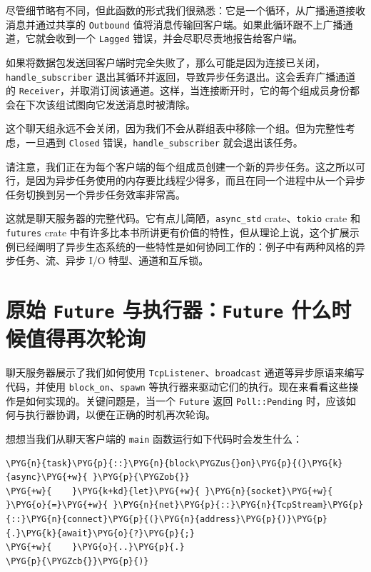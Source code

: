 尽管细节略有不同，但此函数的形式我们很熟悉：它是一个循环，从广播通道接收消息并通过共享的 \texttt{Outbound} 值将消息传输回客户端。如果此循环跟不上广播通道，它就会收到一个 \texttt{Lagged} 错误，并会尽职尽责地报告给客户端。

如果将数据包发送回客户端时完全失败了，那么可能是因为连接已关闭，\texttt{handle\_subscriber} 退出其循环并返回，导致异步任务退出。这会丢弃广播通道的 \texttt{Receiver}，并取消订阅该通道。这样，当连接断开时，它的每个组成员身份都会在下次该组试图向它发送消息时被清除。

这个聊天组永远不会关闭，因为我们不会从群组表中移除一个组。但为完整性考虑，一旦遇到 \texttt{Closed} 错误，\texttt{handle\_subscriber} 就会退出该任务。

请注意，我们正在为每个客户端的每个组成员创建一个新的异步任务。这之所以可行，是因为异步任务使用的内存要比线程少得多，而且在同一个进程中从一个异步任务切换到另一个异步任务效率非常高。

这就是聊天服务器的完整代码。它有点儿简陋，\texttt{async\_std} crate、\texttt{tokio} crate 和 \texttt{futures} crate 中有许多比本书所讲更有价值的特性，但从理论上说，这个扩展示例已经阐明了异步生态系统的一些特性是如何协同工作的：例子中有两种风格的异步任务、流、异步 I/O 特型、通道和互斥锁。

\section{原始 \texttt{Future} 与执行器：\texttt{Future} 什么时候值得再次轮询}

聊天服务器展示了我们如何使用 \texttt{TcpListener}、\texttt{broadcast} 通道等异步原语来编写代码，并使用 \texttt{block\_on}、\texttt{spawn} 等执行器来驱动它们的执行。现在来看看这些操作是如何实现的。关键问题是，当一个 \texttt{Future} 返回 \texttt{Poll::Pending} 时，应该如何与执行器协调，以便在正确的时机再次轮询。

想想当我们从聊天客户端的 \texttt{main} 函数运行如下代码时会发生什么：

\begin{Verbatim}[commandchars=\\\{\},breaklines=true,breakanywhere=true,fontsize=\codefont,xleftmargin=17bp]
\PYG{n}{task}\PYG{p}{::}\PYG{n}{block\PYGZus{}on}\PYG{p}{(}\PYG{k}{async}\PYG{+w}{ }\PYG{p}{\PYGZob{}}
\PYG{+w}{    }\PYG{k+kd}{let}\PYG{+w}{ }\PYG{n}{socket}\PYG{+w}{ }\PYG{o}{=}\PYG{+w}{ }\PYG{n}{net}\PYG{p}{::}\PYG{n}{TcpStream}\PYG{p}{::}\PYG{n}{connect}\PYG{p}{(}\PYG{n}{address}\PYG{p}{)}\PYG{p}{.}\PYG{k}{await}\PYG{o}{?}\PYG{p}{;}
\PYG{+w}{    }\PYG{o}{..}\PYG{p}{.}
\PYG{p}{\PYGZcb{}}\PYG{p}{)}
\end{Verbatim}

